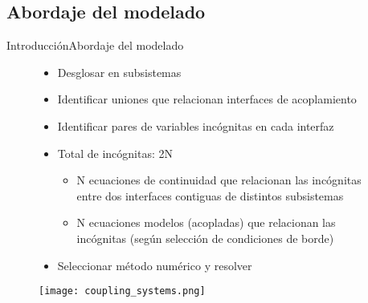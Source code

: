 \subsection{Abordaje del modelado}
\begin{frame}{Introducción}{Abordaje del modelado}


  \begin{figure}[ht]
    \begin{minipage}{0.58\linewidth}
      \begin{itemize}
      \item <2-> Desglosar en subsistemas
      \item <3-> Identificar uniones que relacionan interfaces de acoplamiento
      \item <4-> Identificar pares de variables incógnitas en cada interfaz
      \item <5-> Total de incógnitas: 2N
        \begin{itemize}
        \item <6-> N ecuaciones de continuidad que relacionan las incógnitas entre dos interfaces contiguas de distintos subsistemas
        \item <7-> N ecuaciones modelos (acopladas) que relacionan las incógnitas (según selección de condiciones de borde)
        \end{itemize} 
      \item <8-> Seleccionar método numérico y resolver
      \end{itemize}    
    \end{minipage}
    \begin{minipage}{0.4\linewidth}
      \centering
      \texttt{[image: coupling\_systems.png]}
      \label{esquma-DDM}
    \end{minipage}
    \label{aasdasd}
  \end{figure}
  
  
\end{frame}




